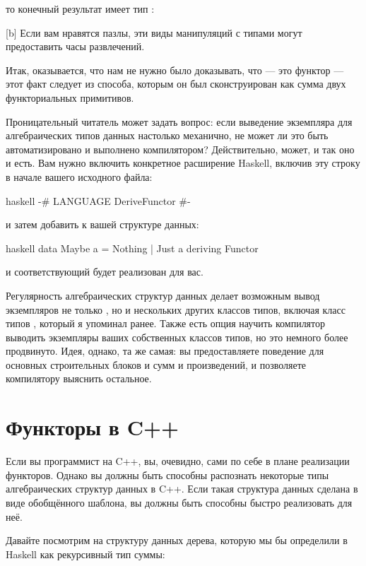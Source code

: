 то конечный результат имеет тип
:

[b]
Если вам нравятся пазлы, эти виды манипуляций с типами могут
предоставить часы развлечений.

Итак, оказывается, что нам не нужно было доказывать, что  --- это
функтор --- этот факт следует из способа, которым он был сконструирован как сумма
двух функториальных примитивов.

Проницательный читатель может задать вопрос: если выведение
экземпляра  для алгебраических типов данных настолько механично,
не может ли это быть автоматизировано и выполнено компилятором? Действительно, может, и
так оно и есть. Вам нужно включить конкретное расширение Haskell, включив
эту строку в начале вашего исходного файла:

\begin{snip}{haskell}
{-# LANGUAGE DeriveFunctor #-}
\end{snip}
и затем добавить  к вашей структуре данных:

\begin{snip}{haskell}
data Maybe a = Nothing | Just a deriving Functor
\end{snip}
и соответствующий  будет реализован для вас.

Регулярность алгебраических структур данных делает возможным вывод
экземпляров не только , но и нескольких других классов типов,
включая класс типов , который я упоминал ранее. Также есть
опция научить компилятор выводить экземпляры ваших
собственных классов типов, но это немного более продвинуто. Идея, однако, та же
самая: вы предоставляете поведение для основных строительных блоков и сумм
и произведений, и позволяете компилятору выяснить остальное.

\section{Функторы в C++}

Если вы программист на C++, вы, очевидно, сами по себе в плане
реализации функторов. Однако вы должны быть способны распознать
некоторые типы алгебраических структур данных в C++. Если такая структура данных
сделана в виде обобщённого шаблона, вы должны быть способны быстро реализовать
 для неё.

Давайте посмотрим на структуру данных дерева, которую мы бы определили в
Haskell как рекурсивный тип суммы:

